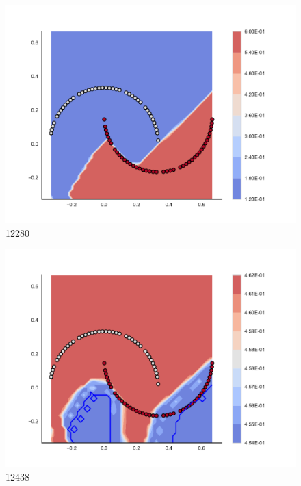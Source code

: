 \begin{subfigure}[b]{0.09\textwidth}
    \includegraphics[clip, trim=2.35cm 1.75cm 4.5cm 0cm,width=\textwidth]{img/convergence/12280.pdf}
    \caption{12280}
    \label{fig:convergence_12280}
\end{subfigure}
%
\begin{subfigure}[b]{0.09\textwidth}
    \includegraphics[clip, trim=2.35cm 1.75cm 4.5cm 0cm,width=\textwidth]{img/convergence/12438.pdf}
    \caption{12438}
    \label{fig:convergence_12438}
\end{subfigure}
%
